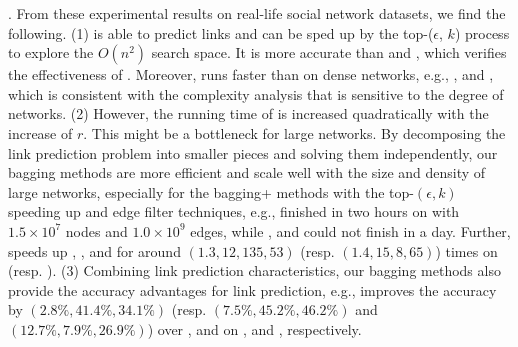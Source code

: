 . From these experimental results on real-life social network datasets,
we find the following. (1) \NMF is able to predict links and can be sped up
by the top-($\epsilon$, $k$) process to explore the $O(n^2)$ search space. It is
more accurate than \Aa and \BIGCLAM, which verifies the effectiveness
of \NMF. Moreover, \NMF runs faster than \BIGCLAM on dense networks,
e.g., \Wikipedia, \Twitter and \Friendster, which is consistent with the complexity analysis
that \BIGCLAM is sensitive to the degree of networks. (2) However, the running time of
\NMF is increased quadratically with the increase of $r$. This might be a bottleneck
for large networks. By decomposing the link prediction problem into smaller pieces
and solving them independently, our bagging methods are more efficient and
scale well with the size and density of large networks, especially for the bagging+
methods with the top-$(\epsilon, k)$ speeding up and edge filter techniques,
e.g., \Biasedp finished in two hours on \Friendster with $1.5\times 10^7$ nodes and
$1.0\times 10^9$ edges, while \NMF, \Aa  and \BIGCLAM could not finish in a day.
Further, \Biasedp speeds up \Biased, \NMF, \Aa and \BIGCLAM
for around $(1.3, 12, 135, 53)$ (resp. $(1.4, 15, 8, 65)$) times on \Twitter (resp. \Friendster).
(3) Combining link prediction characteristics, our
bagging methods also provide the accuracy advantages for link prediction,
e.g., \Biased improves the accuracy by
$(2.8\%, 41.4\%, 34.1\%)$ (resp. $(7.5\%, 45.2\%, 46.2\%)$ and $(12.7\%, 7.9\%, 26.9\%)$)
over \NMF, \Aa and \BIGCLAM on \Digg, \YouTube and \Wikipedia, respectively.













%
%
%
%
%
%


